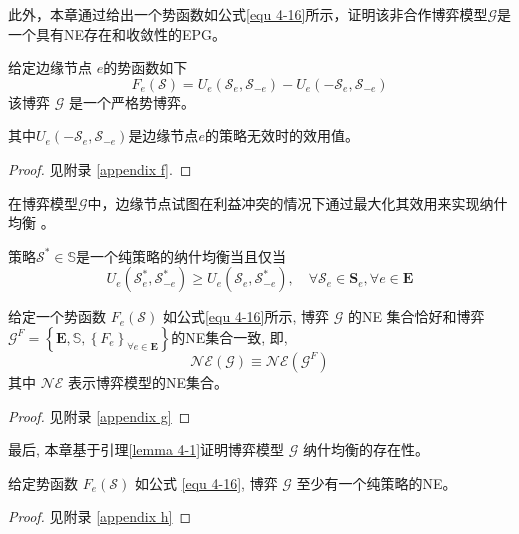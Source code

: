 此外，本章通过给出一个势函数如公式\ref{equ 4-16}所示，证明该非合作博弈模型$\mathcal{G}$是一个具有NE存在和收敛性的EPG。
\begin{theorem}
给定边缘节点 $e$的势函数如下
\begin{equation}
	{F}_{e}\left(\mathcal{S}\right) = {U}_{e}\left(\mathcal{S}_{e}, \mathcal{S}_{-e}\right) - {U}_{e}\left(-\mathcal{S}_{e}, \mathcal{S}_{-e}\right)
	\label{equ 4-16}
\end{equation}
该博弈 $\mathcal{G}$ 是一个严格势博弈。
\label{theorem 4-1}
\end{theorem}
\noindent 其中${U}_{e}\left(-\mathcal{S}_{e}, \mathcal{S}_{-e}\right)$是边缘节点$e$的策略无效时的效用值。
\begin{proof} 见附录 \ref{appendix f}.
\end{proof}
\noindent 在博弈模型$\mathcal{G}$中，边缘节点试图在利益冲突的情况下通过最大化其效用来实现纳什均衡 \cite{chew2016potential}。
\begin{definition}
策略$\mathcal{S}^{*} \in \mathbb{S}$是一个纯策略的纳什均衡\cite{chew2016potential}当且仅当
	\begin{equation}
		U_{e}\left(\mathcal{S}_{e}^{*}, \mathcal{S}_{-e}^{*}\right) \geq U_{e}\left(\mathcal{S}_{e}, \mathcal{S}_{-e}^{*}\right), \quad \forall \mathcal{S}_{e} \in \mathbf{S}_{e}, \forall e \in \mathbf{E}
	\end{equation}
\end{definition}
\begin{lemma}
	给定一个势函数 $F_{e}(\mathcal{S})$ 如公式\ref{equ 4-16}所示, 博弈 $\mathcal{G}$ 的NE 集合恰好和博弈$\mathcal{G}^{F}=\left\{\mathbf{E}, \mathbb{S}, \left\{{F}_{e}\right\}_{\forall e \in \mathbf{E}} \right\}$的NE集合一致, 即,
	\begin{equation}
		\mathcal{NE}(\mathcal{G}) \equiv \mathcal{NE}\left(\mathcal{G}^{F}\right)
	\end{equation}
	其中 $\mathcal{NE}$ 表示博弈模型的NE集合。
\label{lemma 4-1}
\end{lemma}
\begin{proof} 见附录 \ref{appendix g}
\end{proof}
\noindent 最后, 本章基于引理\ref{lemma 4-1}证明博弈模型 $\mathcal{G}$ 纳什均衡的存在性。
\begin{theorem}
	给定势函数 $F_{e}(\mathcal{S})$ 如公式 \ref{equ 4-16}, 博弈 $\mathcal{G}$ 至少有一个纯策略的NE。
\label{theorem 4-2}
\end{theorem}
\begin{proof} 见附录 \ref{appendix h}
\end{proof}
